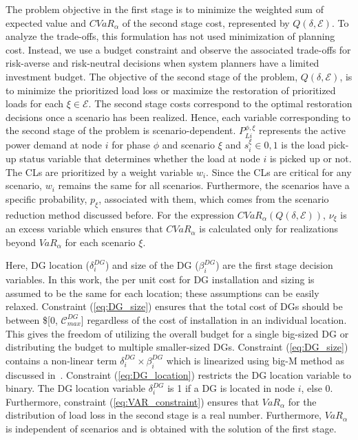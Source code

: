 The problem objective in the first stage is to minimize the weighted sum of expected value and $CVaR_\alpha$ of the second stage cost, represented by $Q(\delta, \mathcal{E})$. To analyze the trade-offs, this formulation has not used minimization of planning cost. Instead, we use a budget constraint and observe the associated trade-offs for risk-averse and risk-neutral decisions when system planners have a limited investment budget. The objective of the second stage of the problem, $Q(\delta, \mathcal{E})$, is to minimize the prioritized load loss or maximize the restoration of prioritized loads for each $\xi \in \mathcal{E}$. The second stage costs correspond to the optimal restoration decisions once a scenario has been realized. Hence, each variable corresponding to the second stage of the problem is scenario-dependent. $P_{Li}^{\phi,\xi}$ represents the active power demand at node $i$ for phase $\phi$ and scenario $\xi$ and $s_i^\xi \in {0, 1}$ is the load pick-up status variable that determines whether the load at node $i$ is picked up or not. The CLs are prioritized by a weight variable $w_i$. Since the CLs are critical for any scenario, $w_i$ remains the same for all scenarios. Furthermore, the scenarios have a specific probability, $p_\xi$, associated with them, which comes from the scenario reduction method discussed before. For the expression $CVaR_\alpha(Q(\delta, \mathcal{E}))$, $\nu_\xi$ is an excess variable which ensures that $CVaR_\alpha$ is calculated only for realizations beyond $VaR_\alpha$ for each scenario $\xi$. 

Here, DG location ($\delta^{DG}_i$) and size of the DG ($\beta^{DG}_i$) are the first stage decision variables. In this work, the per unit cost for DG installation and sizing is assumed to be the same for each location; these assumptions can be easily relaxed.  
Constraint (\ref{eq:DG_size}) ensures that the total cost of DGs should be between \$[0, $\mathcal{C}^{DG}_{max}$] regardless of the cost of installation in an individual location. This gives the freedom of utilizing the overall budget for a single big-sized DG or distributing the budget to multiple smaller-sized DGs. Constraint (\ref{eq:DG_size}) contains a non-linear term $\delta_i^{DG} \times \beta^{DG}_i$ which is linearized using big-M method as discussed in~\cite{coelho2013linearization}. Constraint (\ref{eq:DG_location}) restricts the DG location variable to binary. The DG location variable $\delta^{DG}_i$ is 1 if a DG is located in node $i$, else 0. Furthermore, constraint (\ref{eq:VAR_constraint}) ensures that $VaR_\alpha$ for the distribution of load loss in the second stage is a real number. Furthermore, $VaR_\alpha$ is independent of scenarios and is obtained with the solution of the first stage. 

